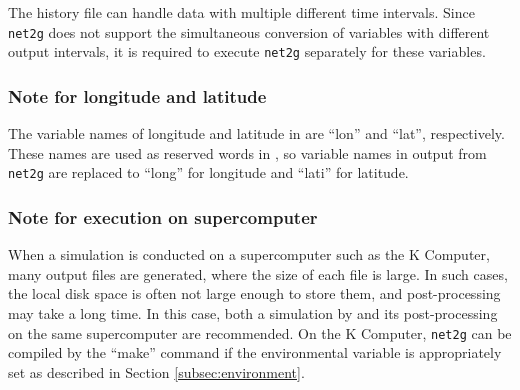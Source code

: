 The history file can handle data with multiple different time intervals.
Since \verb|net2g| does not support the simultaneous conversion of variables with different output intervals,
it is required to execute \verb|net2g| separately for these variables.


\subsubsection{Note for longitude and latitude}
The variable names of longitude and latitude in \scalerm are ``lon'' and ``lat'', respectively.
These names are used as reserved words in \grads,
so variable names in output from \verb|net2g| are replaced to ``long'' for longitude and ``lati'' for latitude.


\subsubsection{Note for execution on supercomputer}
When a simulation is conducted on a supercomputer such as the K Computer, many output files are generated, where the size of each file is large.
In such cases, the local disk space is often not large enough to store them, and post-processing may take a long time.
In this case, both a simulation by \scalerm and its post-processing on the same supercomputer are recommended.
On the K Computer, \verb|net2g| can be compiled by the ``make'' command  if the environmental variable is appropriately set as described in Section \ref{subsec:environment}.
